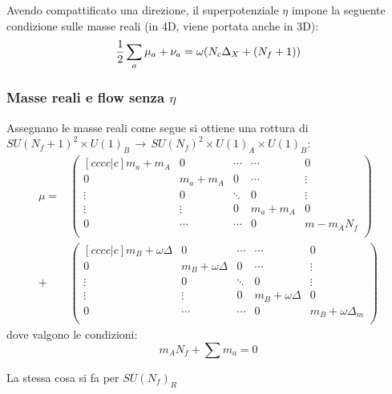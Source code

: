 \documentclass[a4paper,12pt]{article}
\begin{document}
Avendo compattificato una direzione, il superpotenziale $\eta$ impone la seguente condizione sulle masse reali (in 4D, viene portata anche in 3D):
\begin{equation}
  { 1 \over 2 } \sum_a \mu_a + \nu_a  = \omega ( N_c \Delta_X + (N_f+1))
  \label{eqn:R-symm Anomaly}
\end{equation}
\subsubsection{Masse reali e flow senza $\eta$}

Assegnano le masse reali come segue si ottiene una rottura di $ SU(N_f+1)^2 \times U(1)_B \, \rightarrow \, SU(N_f)^2 \times U(1)_A \times U(1)_B$:
\begin{align*}
\mu = &
\begin{pmatrix}[c c c c|c]
		m_a + m_A 	& 0 		& \cdots 	& \cdots 	& 0 \\
		0 			 & m_a + m_A & 0 &\cdots & \vdots \\
		\vdots 		& 0 		& \ddots & 0 & \vdots \\
		\vdots & \vdots & 0 & m_a + m_A & 0 \\
		\hline 
		0 & \cdots & \cdots & 0 & m  - m_A N_f\\
\end{pmatrix} \\
+ &
\begin{pmatrix}[c c c c|c]
		m_B + \omega \Delta 	& 0 		& \cdots 	& \cdots 	& 0 \\
		0 			 & m_B + \omega \Delta & 0 &\cdots & \vdots \\
		\vdots 		& 0 		& \ddots & 0 & \vdots \\
		\vdots & \vdots & 0 & m_B + \omega \Delta & 0 \\
		\hline 
		0 & \cdots & \cdots & 0 &  m_B + \omega \Delta_m\\
\end{pmatrix}
\end{align*}
dove valgono le condizioni:
$$
 m_A N_f + \sum m_a = 0  %
$$
\begin{comment}
Notare come si giunge così a:
$$
m  + \sum_a^{N_f} m_a   = tr_{SU(N_f+1)} m_i = 0 \quad \mbox{dove} \quad m = m_{N_f+1}
$$
Ottenendo così i vincoli che la rottura di $SU(N_f+1) \rightarrow SU(N_f) \times U(1)$.\\
\end{comment}
La stessa cosa si fa per $SU(N_f)_R$ \\
\end{document}
